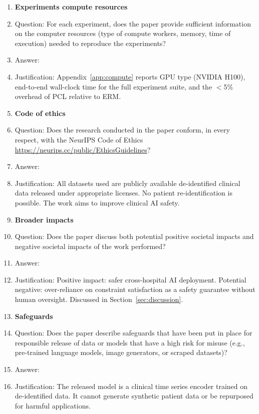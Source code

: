 \documentclass{article}
\begin{document}
\begin{enumerate}
\item {\bf Experiments compute resources}
    \item[] Question: For each experiment, does the paper provide sufficient information on the computer resources (type of compute workers, memory, time of execution) needed to reproduce the experiments?
    \item[] Answer: \answerYes{}
    \item[] Justification: Appendix~\ref{app:compute} reports GPU type (NVIDIA H100), end-to-end wall-clock time for the full experiment suite, and the $<$5\% overhead of PCL relative to ERM.

\item {\bf Code of ethics}
    \item[] Question: Does the research conducted in the paper conform, in every respect, with the NeurIPS Code of Ethics \url{https://neurips.cc/public/EthicsGuidelines}?
    \item[] Answer: \answerYes{}
    \item[] Justification: All datasets used are publicly available de-identified clinical data released under appropriate licenses. No patient re-identification is possible. The work aims to improve clinical AI safety.

\item {\bf Broader impacts}
    \item[] Question: Does the paper discuss both potential positive societal impacts and negative societal impacts of the work performed?
    \item[] Answer: \answerYes{}
    \item[] Justification: Positive impact: safer cross-hospital AI deployment. Potential negative: over-reliance on constraint satisfaction as a safety guarantee without human oversight. Discussed in Section~\ref{sec:discussion}.

\item {\bf Safeguards}
    \item[] Question: Does the paper describe safeguards that have been put in place for responsible release of data or models that have a high risk for misuse (e.g., pre-trained language models, image generators, or scraped datasets)?
    \item[] Answer: \answerNA{}
    \item[] Justification: The released model is a clinical time series encoder trained on de-identified data. It cannot generate synthetic patient data or be repurposed for harmful applications.


\end{enumerate}
\end{document}
